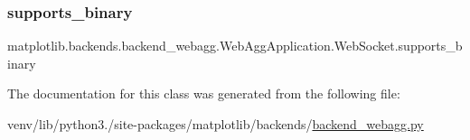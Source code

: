 \subsubsection{\texorpdfstring{supports\+\_\+binary}{supports\_binary}\hspace{0.1cm}{\footnotesize\ttfamily [2/2]}}
{\footnotesize\ttfamily matplotlib.\+backends.\+backend\+\_\+webagg.\+Web\+Agg\+Application.\+Web\+Socket.\+supports\+\_\+binary}



The documentation for this class was generated from the following file\+:\begin{DoxyCompactItemize}
\item 
venv/lib/python3./site-\/packages/matplotlib/backends/\hyperlink{backend__webagg_8py}{backend\+\_\+webagg.\+py}\end{DoxyCompactItemize}
